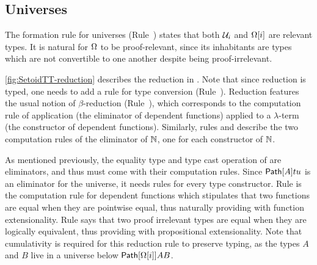\subsection{Universes}
\label{sec:universe}

The formation rule for universes (Rule~) states
that both \( \mathcal{U}_i \) and \( \Omega[i] \) are relevant types. It is natural
for \( \Omega \) to be proof-relevant, since its inhabitants are
types which are not convertible to one another despite being proof-irrelevant.




\cref{fig:SetoidTT-reduction} describes the reduction in
\SetoidTT. Note that since reduction is typed,
one needs to add a rule for type conversion
(Rule~).
%
Reduction features the usual notion of $\beta$-reduction
(Rule~), which corresponds to the
computation rule of application (the eliminator of dependent
functions) applied to a $\lambda$-term (the constructor of dependent
functions).
%
Similarly, rules  and
 describe the two computation rules
of the eliminator of $\mathbb{N}$, one for each constructor of $\mathbb{N}$.

As mentioned previously, the equality type and type cast operation of
\SetoidTT are eliminators, and thus must come with their
computation rules.
%
Since $\mathsf{Path}[A]{t}{u}$ is an eliminator for the universe, it needs rules
for every type constructor.
%
Rule  is the computation rule for dependent
functions which stipulates that two functions are equal when they
are pointwise equal, thus naturally providing \SetoidTT with
function extensionality.
%
Rule  says that two proof irrelevant
types are equal when they are logically equivalent, thus
providing \SetoidTT with propositional extensionality. Note that
cumulativity is required for this reduction rule to preserve typing,
as the types $A$ and $B$ live in a universe below $\mathsf{Path}[{\Omega[i]}]{A}{B}$.


